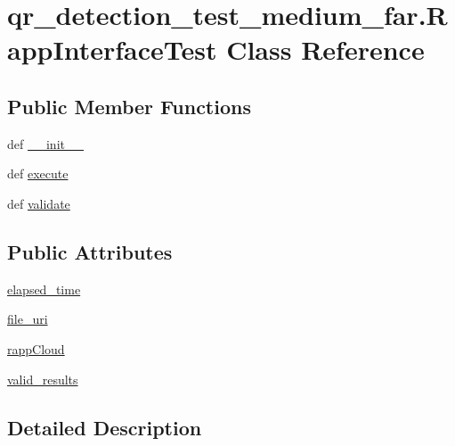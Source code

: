 \hypertarget{classqr__detection__test__medium__far_1_1RappInterfaceTest}{\section{qr\-\_\-detection\-\_\-test\-\_\-medium\-\_\-far.\-Rapp\-Interface\-Test Class Reference}
\label{classqr__detection__test__medium__far_1_1RappInterfaceTest}
}
\subsection*{Public Member Functions}
\begin{DoxyCompactItemize}
\item 
def \hyperlink{classqr__detection__test__medium__far_1_1RappInterfaceTest_a88e8ad9c6927ff15ec0aa1b72ee1c77a}{\-\_\-\-\_\-init\-\_\-\-\_\-}
\item 
def \hyperlink{classqr__detection__test__medium__far_1_1RappInterfaceTest_a910633feee74e58de761bb7531aca9ff}{execute}
\item 
def \hyperlink{classqr__detection__test__medium__far_1_1RappInterfaceTest_afafc365feefd8752b874d62bdd770617}{validate}
\end{DoxyCompactItemize}
\subsection*{Public Attributes}
\begin{DoxyCompactItemize}
\item 
\hyperlink{classqr__detection__test__medium__far_1_1RappInterfaceTest_a2e93baf76cef714feb0d5369b75d8d78}{elapsed\-\_\-time}
\item 
\hyperlink{classqr__detection__test__medium__far_1_1RappInterfaceTest_ae3f8e9d13569cab4eca087b5b28c2c7d}{file\-\_\-uri}
\item 
\hyperlink{classqr__detection__test__medium__far_1_1RappInterfaceTest_a3d450b8dc0026991c4f0f07e905bfe7b}{rapp\-Cloud}
\item 
\hyperlink{classqr__detection__test__medium__far_1_1RappInterfaceTest_a0d01001233a4d4e6c5c34396220e0fa8}{valid\-\_\-results}
\end{DoxyCompactItemize}


\subsection{Detailed Description}


